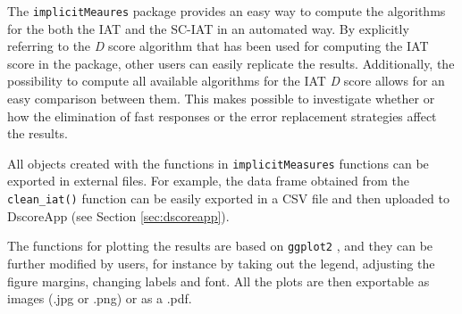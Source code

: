 \documentclass[12pt]{book}
\begin{document}
The \verb*|implicitMeaures| package provides an easy way to compute the algorithms for the both the IAT and the SC-IAT in an automated way. By explicitly referring to the \emph{D} score algorithm that has been used for computing the IAT score in the package, other users can easily replicate the results. 
Additionally, the possibility to compute all available algorithms for the IAT \emph{D} score allows for an easy comparison between them. This makes possible to investigate whether or how the elimination of fast responses or the error replacement strategies affect the results. 


All objects created with the functions in \verb*|implicitMeasures| functions can be exported in external files. For example, the data frame obtained from the \verb*|clean_iat()| function can be easily exported in a CSV file and then uploaded to DscoreApp (see Section \ref{sec:dscoreapp}).  

The functions for plotting the results are based on \verb*|ggplot2| \cite{ggplot2}, and they can be further modified by users, for instance by taking out the legend, adjusting the figure margins, changing labels and font. All the plots are then exportable as images (.jpg or .png) or as a .pdf.



% 
%
\end{document}
